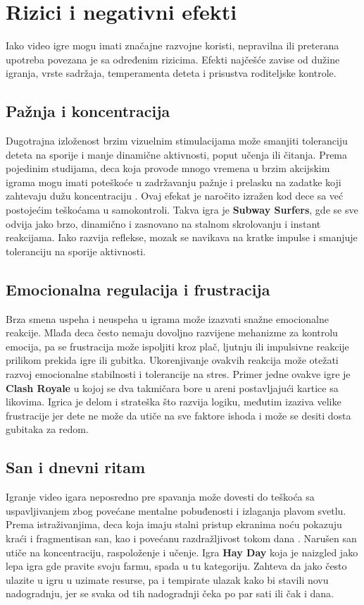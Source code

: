 \documentclass[a4paper,12pt]{article}
\begin{document}
\section{Rizici i negativni efekti}

Iako video igre mogu imati značajne razvojne koristi, nepravilna ili preterana upotreba povezana je sa određenim rizicima. Efekti najčešće zavise od dužine igranja, vrste sadržaja, temperamenta deteta i prisustva roditeljske kontrole.

\subsection*{Pažnja i koncentracija}
Dugotrajna izloženost brzim vizuelnim stimulacijama može smanjiti toleranciju deteta na sporije i manje dinamične aktivnosti, poput učenja ili čitanja. 
Prema pojedinim studijama, deca koja provode mnogo vremena u brzim akcijskim igrama mogu imati poteškoće u zadržavanju pažnje i prelasku na zadatke koji zahtevaju dužu koncentraciju \cite{anderson2010violent}. 
Ovaj efekat je naročito izražen kod dece sa već postojećim teškoćama u samokontroli. Takva igra je \textbf{Subway Surfers}, gde se sve odvija jako brzo, dinamično i zasnovano na stalnom skrolovanju i instant reakcijama. Iako razvija reflekse, mozak se navikava na kratke impulse i smanjuje toleranciju na sporije aktivnosti.

\subsection*{Emocionalna regulacija i frustracija}
Brza smena uspeha i neuspeha u igrama može izazvati snažne emocionalne reakcije. 
Mlađa deca često nemaju dovoljno razvijene mehanizme za kontrolu emocija, pa se frustracija može ispoljiti kroz plač, ljutnju ili impulsivne reakcije prilikom prekida igre ili gubitka.
Ukorenjivanje ovakvih reakcija može otežati razvoj emocionalne stabilnosti i tolerancije na stres. Primer jedne ovakve igre je \textbf{Clash Royale} u kojoj se dva takmičara bore u areni postavljajući kartice sa likovima. Igrica je delom i strateška što razvija logiku, međutim izaziva velike frustracije jer dete ne može da utiče na sve faktore ishoda i može se desiti dosta gubitaka za redom.

\subsection*{San i dnevni ritam}
Igranje video igara neposredno pre spavanja može dovesti do teškoća sa uspavljivanjem zbog povećane mentalne pobuđenosti i izlaganja plavom svetlu. 
Prema istraživanjima, deca koja imaju stalni pristup ekranima noću pokazuju kraći i fragmentisan san, kao i povećanu razdražljivost tokom dana \cite{bold2022sleep}. 
Narušen san utiče na koncentraciju, raspoloženje i učenje. Igra \textbf{Hay Day} koja je naizgled jako lepa igra gde pravite svoju farmu, spada u tu kategoriju. Zahteva da jako često ulazite u igru u uzimate resurse, pa i tempirate ulazak kako bi stavili novu nadogradnju, jer se svaka od tih nadogradnji čeka po par sati ili čak i dana.
\end{document}
